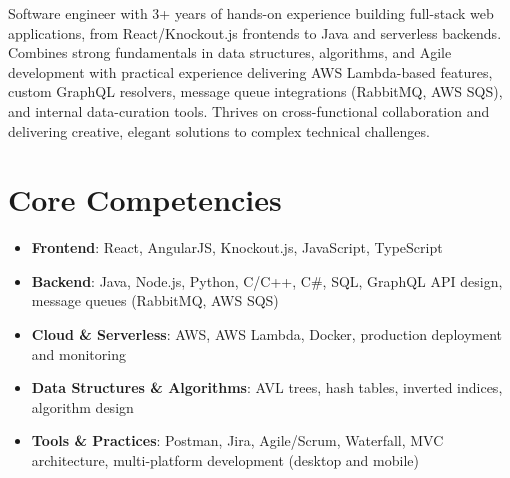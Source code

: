\documentclass[11pt,a4paper,sans]{moderncv}
\begin{document}
\makecvtitle


\vspace{6pt}
\small{Software engineer with 3+ years of hands-on experience building full-stack web applications, from React/Knockout.js frontends to Java and serverless backends. Combines strong fundamentals in data structures, algorithms, and Agile development with practical experience delivering AWS Lambda-based features, custom GraphQL resolvers, message queue integrations (RabbitMQ, AWS SQS), and internal data-curation tools. Thrives on cross-functional collaboration and delivering creative, elegant solutions to complex technical challenges.}


\section{Core Competencies}
\vspace{1pt}
\begin{itemize}

\item \textbf{Frontend}: React, AngularJS, Knockout.js, JavaScript, TypeScript

\item \textbf{Backend}: Java, Node.js, Python, C/C++, C\#, SQL, GraphQL API design, message queues (RabbitMQ, AWS SQS)

\item \textbf{Cloud \& Serverless}: AWS, AWS Lambda, Docker, production deployment and monitoring

\item \textbf{Data Structures \& Algorithms}: AVL trees, hash tables, inverted indices, algorithm design

\item \textbf{Tools \& Practices}: Postman, Jira, Agile/Scrum, Waterfall, MVC architecture, multi-platform development (desktop and mobile)

\end{itemize}

\end{document}

